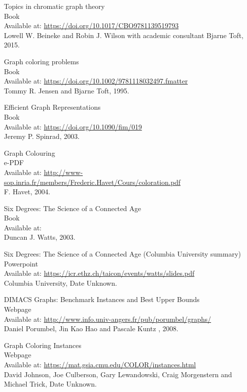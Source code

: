 \documentclass[12pt, a4paper]{article}
\begin{document}
{\begin{thebibliography}{12}
 Topics in chromatic graph theory\\
Book\\
Available at: \url{https://doi.org/10.1017/CBO9781139519793}\\
Lowell W. Beineke and Robin J. Wilson with academic consultant Bjarne Toft, 2015.

 Graph coloring problems\\
Book\\
Available at: \url{https://doi.org/10.1002/9781118032497.fmatter}\\
Tommy R. Jensen and Bjarne Toft, 1995.

 Efficient Graph Representations\\
Book\\
Available at: \url{https://doi.org/10.1090/fim/019}\\
Jeremy P. Spinrad, 2003.

 Graph Colouring\\
e-PDF\\
Available at: \url{http://www-sop.inria.fr/members/Frederic.Havet/Cours/coloration.pdf}\\
F. Havet, 2004.

 Six Degrees: The Science of a Connected Age\\
Book\\
Available at: \url{}\\
Duncan J. Watts, 2003.

 Six Degrees: The Science of a Connected Age (Columbia University summary)\\
Powerpoint\\
Available at: \url{https://icr.ethz.ch/taicon/events/watts/slides.pdf}\\
Columbia University, Date Unknown.

DIMACS Graphs: Benchmark Instances and Best Upper Bounds\\
Webpage\\
Available at: \url{http://www.info.univ-angers.fr/pub/porumbel/graphs/}\\
Daniel Porumbel, Jin Kao Hao and Pascale Kuntz , 2008.

 Graph Coloring Instances\\
Webpage\\
Available at: \url{https://mat.gsia.cmu.edu/COLOR/instances.html}\\
David Johnson, Joe Culberson, Gary Lewandowski, Craig Morgenstern and Michael Trick, Date Unknown.


\end{thebibliography}}
\end{document}
